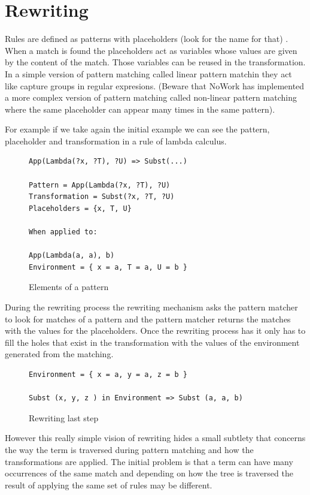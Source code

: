 \documentclass[12pt,a4paper]{article}
\begin{document}
\section{Rewriting}

Rules are defined as patterns with placeholders (look for the name for
that) . When a match is found the placeholders act as variables whose
values are given by the content of the match. Those variables can be
reused in the transformation. In a simple version of pattern matching
called linear pattern matchin they act like capture groups in regular
expresions. (Beware that NoWork has implemented a more complex version of
pattern matching called non-linear pattern matching where the same
placeholder can appear many times in the same pattern).

For example if we take again the initial example we can see the
pattern, placeholder and transformation in a rule of lambda calculus.

\begin{figure}
\begin{verbatim}
App(Lambda(?x, ?T), ?U) => Subst(...)

Pattern = App(Lambda(?x, ?T), ?U)
Transformation = Subst(?x, ?T, ?U)
Placeholders = {x, T, U}

When applied to:

App(Lambda(a, a), b)
Environment = { x = a, T = a, U = b }

\end{verbatim}
\caption{Elements of a pattern}
\end{figure}

During the rewriting process the rewriting mechanism asks the pattern
matcher to look for matches of a pattern and the pattern matcher
returns the matches with the values for the placeholders. Once the
rewriting process has it only has to fill the holes that exist in the
transformation with the values of the environment generated from the
matching.


\begin{figure}
\begin{verbatim}
Environment = { x = a, y = a, z = b }

Subst (x, y, z ) in Environment => Subst (a, a, b) 

\end{verbatim}
\caption{Rewriting last step}
\end{figure}

However this really simple vision of rewriting hides a small subtlety
that concerns the way the term is traversed during pattern matching
and how the transformations are applied. The initial problem is that
a term can have many occurrences of the same match and depending on
how the tree is traversed the result of applying the same set of rules
may be different.
\end{document}
